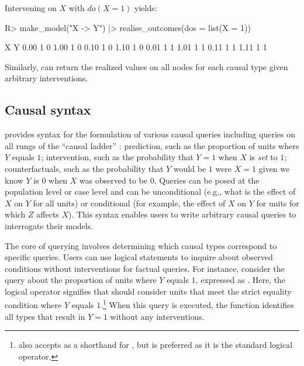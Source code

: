 \documentclass[
  11pt,
  article]{jss}
\renewcommand{\texttt}[1]{\code{#1}}
\begin{document}
Intervening on \(X\) \citep[see][]{pearl_causality_2009} with
\(do(X=1)\) yields:

\begin{CodeChunk}
\begin{CodeInput}
R> make_model("X -> Y") |> realise_outcomes(dos = list(X = 1))
\end{CodeInput}

\begin{CodeOutput}
     X Y
0.00 1 0
1.00 1 0
0.10 1 0
1.10 1 0
0.01 1 1
1.01 1 1
0.11 1 1
1.11 1 1
\end{CodeOutput}
\end{CodeChunk}

Similarly, \texttt{realise\_outcomes()} can return the realized values
on all nodes for each causal type given arbitrary interventions.

\subsection{Causal syntax}\label{sec-syntax}

 provides syntax for the formulation of various
causal queries including queries on all rungs of the ``causal ladder''
\citep{pearl_causality_2009}: prediction, such as the proportion of
units where \(Y\) equals \(1\); intervention, such as the probability
that \(Y = 1\) when \(X\) is \emph{set} to \(1\); counterfactuals, such
as the probability that \(Y\) would be \(1\) were \(X = 1\) given we
know \(Y\) is \(0\) when \(X\) was observed to be \(0\). Queries can be
posed at the population level or case level and can be unconditional
(e.g., what is the effect of \(X\) on \(Y\) for all units) or
conditional (for example, the effect of \(X\) on \(Y\) for units for
which \(Z\) affects \(X\)). This syntax enables users to write arbitrary
causal queries to interrogate their models.

The core of querying involves determining which causal types correspond
to specific queries. Users can use logical statements to inquire about
observed conditions without interventions for factual queries. For
instance, consider the query about the proportion of units where \(Y\)
equals \(1\), expressed as \texttt{"Y\ ==\ 1"}. Here, the logical
operator \texttt{==} signifies that  should consider
units that meet the strict equality condition where \(Y\) equals
\(1\).\footnote{ also accepts \texttt{=} as a
  shorthand for \texttt{==}, but \texttt{==} is preferred as it is the
  standard logical operator.} When this query is executed, the
\texttt{get\_query\_types()} function identifies all types that result
in \(Y=1\) without any interventions.
\end{document}
